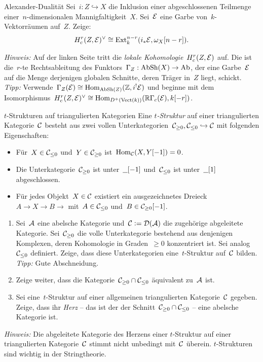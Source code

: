 \documentclass{uebblatt}
\begin{document}
\begin{aufgabe}{Alexander-Dualität}
Sei~$i : Z \hookrightarrow X$ die Inklusion einer abgeschlossenen Teilmenge
einer~$n$-dimensionalen Mannigfaltigkeit~$X$. Sei~$\mathcal{E}$ eine Garbe
von~$k$-Vektorräumen auf~$Z$. Zeige: \[ H_c^r(Z,\mathcal{E})^\vee \cong
\mathrm{Ext}_k^{n-r}(i_*\mathcal{E}, \omega_X[n-r]). \]

{\tiny\emph{Hinweis:} Auf der linken Seite tritt die \emph{lokale
Kohomologie}~$H_c^r(Z,\mathcal{E})$ auf. Die ist die~$r$-te Rechtsableitung des
Funktors~$\Gamma_Z : \mathrm{AbSh}(X) \to \mathrm{Ab}$, der eine Garbe~$\mathcal{E}$ auf die Menge
derjenigen globalen Schnitte, deren Träger in~$Z$ liegt, schickt. \emph{Tipp:}
Verwende~$\Gamma_Z(\mathcal{E}) \cong \mathrm{Hom}_{\mathrm{AbSh}(Z)}(\mathbb{Z},i^!\mathcal{E})$ und beginne mit dem
Isomorphismus~$H_c^r(Z,\mathcal{E})^\vee \cong \mathrm{Hom}_{D^+(\mathrm{Vect}(k))}(\mathbb{R} \Gamma_c(\mathcal{E}),
k[-r])$.\par}
\end{aufgabe}

\begin{aufgabe}{$t$-Strukturen auf triangulierten Kategorien}
Eine \emph{$t$-Struktur} auf einer triangulierten Kategorie~$\mathcal{C}$ besteht aus
zwei vollen Unterkategorien~$\mathcal{C}_{\geq 0}, \mathcal{C}_{\leq 0} \hookrightarrow \mathcal{C}$ mit
folgenden Eigenschaften:
\begin{itemize}
\item Für~$X \in \mathcal{C}_{\leq 0}$ und~$Y \in \mathcal{C}_{\geq 0}$ ist~$\mathrm{Hom}_{\mathcal{C}}(X,Y[-1]) =
0$.
\item Die Unterkategorie~$\mathcal{C}_{\geq 0}$ ist
unter~$\underline{\ \ }[-1]$ und~$\mathcal{C}_{\leq 0}$ ist
unter~$\underline{\ \ }[1]$ abgeschlossen.
\item Für jedes Objekt~$X \in \mathcal{C}$ existiert ein ausgezeichnetes Dreieck~$A \to
X \to B \to$ mit~$A \in \mathcal{C}_{\leq 0}$ und~$B \in \mathcal{C}_{\geq 0}[-1]$.
\end{itemize}
\begin{enumerate}
\item Sei~$\mathcal{A}$ eine abelsche Kategorie und~$\mathcal{C} \vcentcolon= \mathcal{D}(\mathcal{A})$ die zugehörige
abgeleitete Kategorie. Sei~$\mathcal{C}_{\geq 0}$ die volle Unterkategorie bestehend aus
denjenigen Komplexen, deren Kohomologie in Graden~$\geq 0$ konzentriert ist.
Sei analog~$\mathcal{C}_{\leq 0}$ definiert. Zeige, dass diese Unterkategorien
eine~$t$-Struktur auf~$\mathcal{C}$ bilden. {\tiny\emph{Tipp:} Gute Abschneidung.}
\item Zeige weiter, dass die Kategorie~$\mathcal{C}_{\geq 0} \cap \mathcal{C}_{\leq 0}$ äquivalent zu~$\mathcal{A}$ ist.
\item Sei eine~$t$-Struktur auf einer allgemeinen triangulierten Kategorie~$\mathcal{C}$
gegeben. Zeige, dass ihr \emph{Herz} -- das ist der der Schnitt~$\mathcal{C}_{\geq 0}
\cap \mathcal{C}_{\leq 0}$ -- eine abelsche Kategorie ist.
\end{enumerate}
{\tiny\emph{Hinweis:} Die abgeleitete Kategorie des Herzens einer $t$-Struktur
auf einer triangulierten Kategorie~$\mathcal{C}$ stimmt nicht unbedingt mit~$\mathcal{C}$
überein. $t$-Strukturen sind wichtig in der Stringtheorie.\par}
\end{aufgabe}
\end{document}
